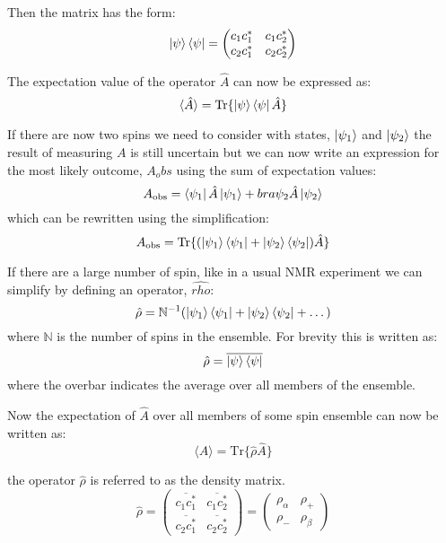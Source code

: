 Then the matrix has the form:
\begin{equation}
\ket{\psi}\bra{\psi} = \begin{pmatrix}
    {c_1c_1^*} & {c_1c_2^*}\\
    {c_2c_1^*} & {c_2c_2^*}
\end{pmatrix}
\end{equation}

The expectation value of the operator $\hat{A}$ can now be expressed as:
\begin{equation}
  \langle\hat{A}\rangle = \text{Tr}\{\ket{\psi}\bra{\psi}\hat{A}\}
\end{equation}

If there are now two spins we need to consider with states, $\ket{\psi_1}$ and $\ket{\psi_2}$ the
result of measuring $A$ is still uncertain but we can now write an expression for the most likely outcome, $A_obs$
using the sum of expectation values:
\begin{equation}
  A_{\text{obs}} = \bra{\psi_1}\hat{A}\ket{\psi_1} + bra{\psi_2}\hat{A}\ket{\psi_2}
\end{equation}
which can be rewritten using the simplification:
\begin{equation}
  A_{\text{obs}} = \text{Tr}\{(\ket{\psi_1}\bra{\psi_1}+\ket{\psi_2}\bra{\psi_2})\hat{A}\}
\end{equation}

If there are a large number of spin, like in a usual NMR experiment we can simplify
by defining an operator, $\hat{rho}$:
\begin{equation}
  \hat{\rho} = \mathbb{N}^{-1}(\ket{\psi_1}\bra{\psi_1}+\ket{\psi_2}\bra{\psi_2}+\dots)
\end{equation}
where $\mathbb{N}$ is the number of spins in the ensemble. For brevity
this is written as:
\begin{equation}
  \hat{\rho} = \overline{\ket{\psi}\bra{\psi}}
\end{equation}
where the overbar indicates the average over all members of the ensemble.

Now the expectation of $\hat{A}$ over all members of some spin ensemble can now be written as:
\begin{equation}
  \langle{A}\rangle = \text{Tr}\{\hat{\rho}\hat{A}\}
\end{equation}

the operator $\hat{\rho}$ is referred to as the density matrix.
\begin{equation}\label{eqn:density}
  \hat{\rho} = \begin{pmatrix}
      \overline{c_1c_1^*} & \overline{c_1c_2^*}\\
      \overline{c_2c_1^*} & \overline{c_2c_2^*}
  \end{pmatrix} = \begin{pmatrix}
      \rho_\alpha & \rho_+\\
      \rho_- & \rho_\beta
  \end{pmatrix}
\end{equation}

